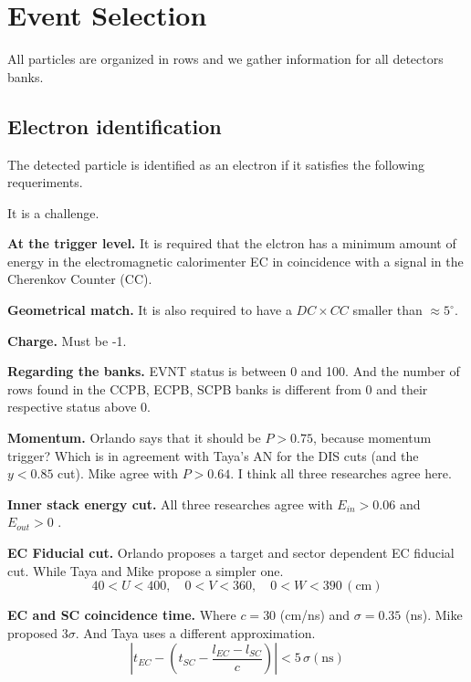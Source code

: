 \chapter{Event Selection}

All particles are organized in rows and we gather information for all detectors banks.

\section{Electron identification}

The detected particle is identified as an electron if it satisfies the following requeriments.

It is a challenge.

\textbf{At the trigger level.} It is required that the elctron has a minimum amount of energy in the electromagnetic calorimenter EC in coincidence with a signal in the Cherenkov Counter (CC).

\textbf{Geometrical match.} It is also required to have a $DC \times CC$ smaller than $\approx 5^\circ$.



\textbf{Charge.} Must be -1.

\textbf{Regarding the banks.} EVNT status is between 0 and 100. And the number of rows found in the CCPB, ECPB, SCPB banks is different from 0 and their respective status above 0.

\textbf{Momentum.} Orlando says that it should be $P > 0.75$, because momentum trigger? Which is in agreement with Taya's AN for the DIS cuts (and the $y < 0.85$ cut). Mike agree with $P > 0.64$. I think all three researches agree here.

\textbf{Inner stack energy cut.} All three researches agree with $E_{in} > 0.06$ and $E_{out} > 0$ .
	    
\textbf{EC Fiducial cut.} Orlando proposes a target and sector dependent EC fiducial cut. While Taya and Mike propose a simpler one.
\begin{equation}
    40 < U < 400, \quad 0 < V < 360, \quad 0 < W < 390 \, (\mbox{cm})
\end{equation}

\textbf{EC and SC coincidence time.} Where $c = 30$ (cm/ns) and $\sigma = 0.35$ (ns). Mike proposed $3\sigma$. And Taya uses a different approximation.
\begin{equation}
    \left| t_{EC} - \left( t_{SC} - \frac{l_{EC} - l_{SC}}{c} \right) \right| < 5 \, \sigma (\mbox{ns})   
\end{equation}

